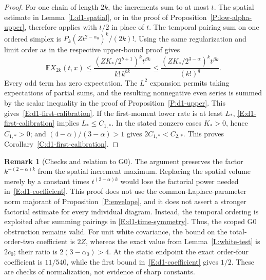 \documentclass[12pt]{article}
\numberwithin{equation}{section}
\theoremstyle{definition}
\newtheorem{remark}[theorem]{Remark}
\newcommand{\E}{\mathbb{E}}
\begin{document}
\begin{proof}
  For one chain of length $2k$, the increments sum to at most $t$.
  The spatial estimate in Lemma~\ref{L:d1-spatial}, or in the proof
  of Proposition~\ref{P:low-alpha-upper}, therefore applies with
  $t/2$ in place of $t$. The temporal pairing sum on one ordered
  simplex is $P_k(Zt^{2-\alpha_0})^k/(2k)!$.
  Using the same regularization and limit order as in the respective
  upper-bound proof gives
  \[
    \E X_{2k}(t,x)
    \le\frac{(ZK_*/2^{b+1})^k t^{\beta k}}{k!\,k^{bk}}
    \le\frac{(ZK_*/2^{3-\alpha})^k t^{\beta k}}{(k!)^q}.
  \]
  Every odd term has zero expectation. The $L^2$ expansion permits
  taking expectations of partial sums, and the resulting nonnegative
  even series is summed by the scalar inequality in the proof of
  Proposition~\ref{P:d1-upper}. This gives~\eqref{E:d1-first-calibration}.
  If the first-moment lower rate is at least $L_*$,
  \eqref{E:d1-first-calibration} implies $L_*\le C_{1,*}$.
  In the stated nonzero cases $K_*>0$, hence
  $C_{1,*}>0$; and $(4-\alpha)/(3-\alpha)>1$ gives
  $2C_{1,*}<C_{2,*}$. This proves
  Corollary~\ref{C:d1-first-calibration}.
\end{proof}

\begin{remark}[Checks and relation to G0]\label{R:d1-upper-checks}
  The argument preserves the factor $k^{-(2-\alpha)k}$ from the
  spatial increment maximum. Replacing the spatial volume merely by
  a constant times $t^{(2-\alpha)k}$ would lose the factorial power
  needed in~\eqref{E:d1-coefficient}. This proof does not use the
  common-Laplace-parameter norm majorant of
  Proposition~\ref{P:envelope}, and it does not assert a stronger
  factorial estimate for every individual diagram. Instead, the
  temporal ordering is exploited after summing pairings in
  \eqref{E:d1-time-symmetry}. Thus, the scoped G0 obstruction remains
  valid. For unit white covariance, the bound on the total-order-two
  coefficient is $2Z$, whereas the exact value from
  Lemma~\ref{L:white-test} is $2c_0$; their ratio is
  $2(3-\alpha_0)>4$. At the static endpoint the exact order-four
  coefficient is $11/540$, while the first bound
  in~\eqref{E:d1-coefficient} gives $1/2$.
  These are checks of normalization, not evidence of sharp constants.
\end{remark}
\end{document}
